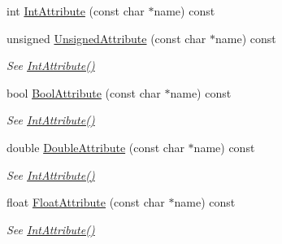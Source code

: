 \begin{DoxyCompactItemize}
\item 
int \hyperlink{classtinyxml2_1_1XMLElement_acfaaeeadf0b0dbe56bb0f5ec12cb7736}{Int\+Attribute} (const char $\ast$name) const
\item 
\mbox{\label{classtinyxml2_1_1XMLElement_a2a1daf6b090f53f5d34bcc71c646ea78}} 
unsigned \hyperlink{classtinyxml2_1_1XMLElement_a2a1daf6b090f53f5d34bcc71c646ea78}{Unsigned\+Attribute} (const char $\ast$name) const
\begin{DoxyCompactList}\small\item\em See \hyperlink{classtinyxml2_1_1XMLElement_acfaaeeadf0b0dbe56bb0f5ec12cb7736}{Int\+Attribute()} \end{DoxyCompactList}\item 
\mbox{\label{classtinyxml2_1_1XMLElement_a07f6033f25eab7b246b57f4bff0758be}} 
bool \hyperlink{classtinyxml2_1_1XMLElement_a07f6033f25eab7b246b57f4bff0758be}{Bool\+Attribute} (const char $\ast$name) const
\begin{DoxyCompactList}\small\item\em See \hyperlink{classtinyxml2_1_1XMLElement_acfaaeeadf0b0dbe56bb0f5ec12cb7736}{Int\+Attribute()} \end{DoxyCompactList}\item 
\mbox{\label{classtinyxml2_1_1XMLElement_a8948baa30b3a557d5ad84e7ab6d445fe}} 
double \hyperlink{classtinyxml2_1_1XMLElement_a8948baa30b3a557d5ad84e7ab6d445fe}{Double\+Attribute} (const char $\ast$name) const
\begin{DoxyCompactList}\small\item\em See \hyperlink{classtinyxml2_1_1XMLElement_acfaaeeadf0b0dbe56bb0f5ec12cb7736}{Int\+Attribute()} \end{DoxyCompactList}\item 
\mbox{\label{classtinyxml2_1_1XMLElement_a69cf755f05fc76a320eb10770845ad8f}} 
float \hyperlink{classtinyxml2_1_1XMLElement_a69cf755f05fc76a320eb10770845ad8f}{Float\+Attribute} (const char $\ast$name) const
\begin{DoxyCompactList}\small\item\em See \hyperlink{classtinyxml2_1_1XMLElement_acfaaeeadf0b0dbe56bb0f5ec12cb7736}{Int\+Attribute()} \end{DoxyCompactList}\item 

\end{DoxyCompactItemize}
